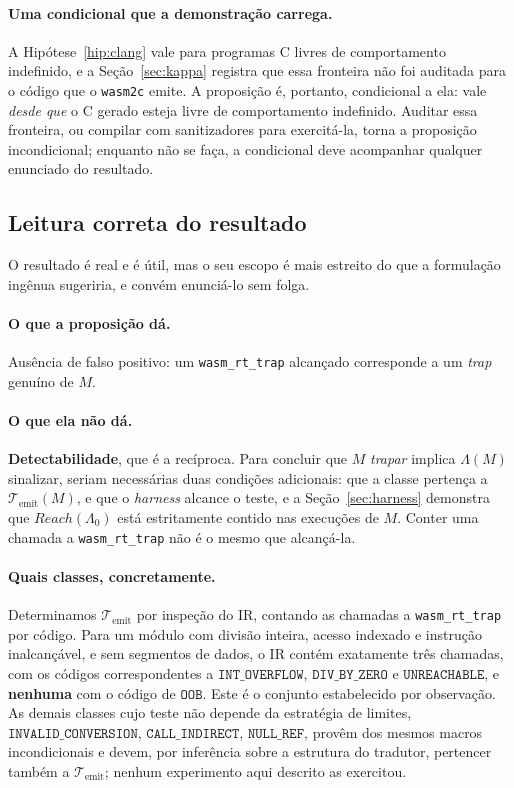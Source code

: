 \documentclass[11pt,a4paper]{article}
\theoremstyle{definition}
\newcommand{\Reach}{\mathit{Reach}}
\newcommand{\code}[1]{\texttt{#1}}
\begin{document}
\paragraph{Uma condicional que a demonstração carrega.}
A Hipótese~\ref{hip:clang} vale para programas C livres de comportamento
indefinido, e a Seção~\ref{sec:kappa} registra que essa fronteira não foi
auditada para o código que o \code{wasm2c} emite. A proposição é, portanto,
condicional a ela: vale \emph{desde que} o C gerado esteja livre de
comportamento indefinido. Auditar essa fronteira, ou compilar com sanitizadores
para exercitá-la, torna a proposição incondicional; enquanto não se faça, a
condicional deve acompanhar qualquer enunciado do resultado.

\subsection{Leitura correta do resultado}

O resultado é real e é útil, mas o seu escopo é mais estreito do que a formulação
ingênua sugeriria, e convém enunciá-lo sem folga.

\paragraph{O que a proposição dá.} Ausência de falso positivo: um
\code{wasm\_rt\_trap} alcançado corresponde a um \emph{trap} genuíno de $M$.

\paragraph{O que ela não dá.} \textbf{Detectabilidade}, que é a recíproca. Para
concluir que $M$ \emph{trapar} implica $\Lambda(M)$ sinalizar, seriam necessárias
duas condições adicionais: que a classe pertença a
$\mathcal{T}_{\mathrm{emit}}(M)$, e que o \emph{harness} alcance o teste, e a
Seção~\ref{sec:harness} demonstra que $\Reach(\Lambda_0)$ está estritamente
contido nas execuções de $M$. Conter uma chamada a \code{wasm\_rt\_trap} não é o
mesmo que alcançá-la.

\paragraph{Quais classes, concretamente.} Determinamos
$\mathcal{T}_{\mathrm{emit}}$ por inspeção do IR, contando as chamadas a
\code{wasm\_rt\_trap} por código. Para um módulo com divisão inteira, acesso
indexado e instrução inalcançável, e sem segmentos de dados, o IR contém
exatamente três chamadas, com os códigos correspondentes a
$\mathtt{INT\_OVERFLOW}$, $\mathtt{DIV\_BY\_ZERO}$ e $\mathtt{UNREACHABLE}$, e
\textbf{nenhuma} com o código de $\mathtt{OOB}$. Este é o conjunto estabelecido
por observação. As demais classes cujo teste não depende da estratégia de limites,
$\mathtt{INVALID\_CONVERSION}$, $\mathtt{CALL\_INDIRECT}$,
$\mathtt{NULL\_REF}$, provêm dos mesmos macros incondicionais e devem, por
inferência sobre a estrutura do tradutor, pertencer também a
$\mathcal{T}_{\mathrm{emit}}$; nenhum experimento aqui descrito as exercitou.
\end{document}

